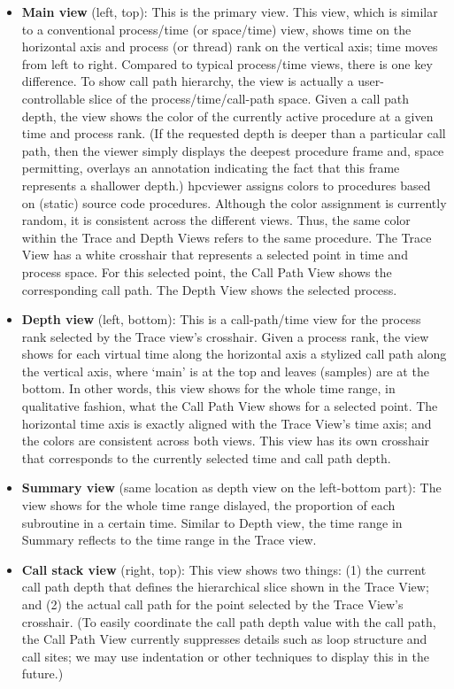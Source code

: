 \documentclass[english]{article}
\begin{document}
\begin{itemize}
\item \textbf{Main view} (left, top):
  This is the primary view.
  This view, which is similar to a conventional process/time (or space/time) view, shows time on the horizontal axis and process (or thread) rank on the vertical axis; time moves from left to right.
  Compared to typical process/time views, there is one key difference.
  To show call path hierarchy, the view is actually a user-controllable slice of the process/time/call-path space.
  Given a call path depth, the view shows the color of the currently active procedure at a given time and process rank.
  (If the requested depth is deeper than a particular call path, then the viewer simply displays the deepest procedure frame and, space permitting, overlays an annotation indicating the fact that this frame represents a shallower depth.)
  hpcviewer assigns colors to procedures based on (static) source code procedures.
  Although the color assignment is currently random, it is consistent across the different views.
  Thus, the same color within the Trace and Depth Views refers to the same procedure.
  The Trace View has a white crosshair that represents a selected point in time and process space.
  For this selected point, the Call Path View shows the corresponding call path.
  The Depth View shows the selected process.

\item \textbf{Depth view} (left, bottom):
  This is a call-path/time view for the process rank selected by the Trace view's crosshair.
  Given a process rank, the view shows for each virtual time along the horizontal axis a stylized call path along the vertical axis, where `main' is at the top and leaves (samples) are at the bottom.
  In other words, this view shows for the whole time range, in qualitative fashion, what the Call Path View shows for a selected point.
  The horizontal time axis is exactly aligned with the Trace View's time axis; and the colors are consistent across both views.
  This view has its own crosshair that corresponds to the currently selected time and call path depth.

\item \textbf{Summary view} (same location as depth view on the left-bottom part):
  The view shows for the whole time range dislayed, the proportion of each subroutine in a certain time.
  Similar to Depth view, the time range in Summary reflects to the time range in the Trace view.

\item \textbf{Call stack view} (right, top):
  This view shows two things: (1) the current call path depth that defines the hierarchical slice shown in the Trace View; and (2) the actual call path for the point selected by the Trace View's crosshair.
  (To easily coordinate the call path depth value with the call path, the Call Path View currently suppresses details such as loop structure and call sites; we may use indentation or other techniques to display this in the future.)


\end{itemize}
\end{document}
